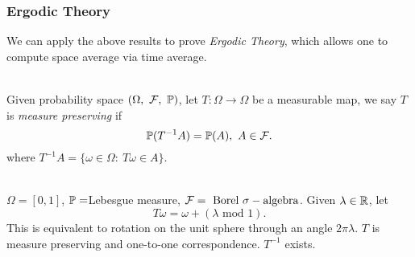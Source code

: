 \vspace{12pt}
\subsubsection{Ergodic Theory}

\np We can apply the above results to prove \textit{Ergodic Theory}, which allows one to compute space average via time average.

\begin{definition}\ \\   
Given probability space $(\Omega,\ \Fs,\ \mathbb{P})$, let $T: \Omega \to \Omega$ be a measurable map, we say $T$ is \textit{measure preserving} if
\begin{equation*}
    \P(T^{-1} A) = \P(A),\ A \in \Fs.
\end{equation*}
where $T^{-1}A = \{\omega \in \Omega:\ T \omega \in A\}$. 
\end{definition}


\begin{example}[Rotation]\ \\
$\Omega = [0,1]$, $\P = $Lebesgue measure, $\Fs = \text{ Borel } \sigma-\text{algebra}$. Given $\lambda \in \R$, let
\begin{equation*}
    T \omega = \omega + (\lambda \text{ mod } 1).
\end{equation*}
This is equivalent to rotation on the unit sphere through an angle $2\pi \lambda$. $T$ is measure preserving and one-to-one correspondence. $T^{-1}$ exists.
\end{example}

